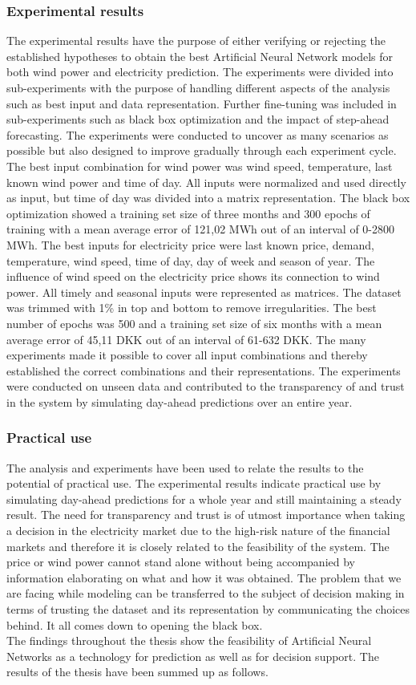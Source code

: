 \subsubsection{Experimental results}
The experimental results have the purpose of either verifying or rejecting the established hypotheses to obtain the best Artificial Neural Network models for both wind power and electricity prediction. The experiments were divided into sub-experiments with the purpose of handling different aspects of the analysis such as best input and data representation. Further fine-tuning was included in sub-experiments such as black box optimization and the impact of step-ahead forecasting. The experiments were conducted to uncover as many scenarios as possible but also designed to improve gradually through each experiment cycle. The best input combination for wind power was wind speed, temperature, last known wind power and time of day. All inputs were normalized and used directly as input, but time of day was divided into a matrix representation. The black box optimization showed a training set size of three months and 300 epochs of training with a mean average error of 121,02 MWh out of an interval of 0-2800 MWh. The best inputs for electricity price were last known price, demand, temperature, wind speed, time of day, day of week and season of year. The influence of wind speed on the electricity price shows its connection to wind power. All timely and seasonal inputs were represented as matrices. The dataset was trimmed with 1\% in top and bottom to remove irregularities. The best number of epochs was 500 and a training set size of six months with a mean average error of 45,11 DKK out of an interval of 61-632 DKK. The many experiments made it possible to cover all input combinations and thereby established the correct combinations and their representations. The experiments were conducted on unseen data and contributed to the transparency of and trust in the system by simulating day-ahead predictions over an entire year.
\subsubsection{Practical use}
The analysis and experiments have been used to relate the results to the potential of practical use. The experimental results indicate practical use by simulating day-ahead predictions for a whole year and still maintaining a steady result. The need for transparency and trust is of utmost importance when taking a decision in the electricity market due to the high-risk nature of the financial markets and therefore it is closely related to the feasibility of the system. The price or wind power cannot stand alone without being accompanied by information elaborating on what and how it was obtained. The problem that we are facing while modeling can be transferred to the subject of decision making in terms of trusting the dataset and its representation by communicating the choices behind. It all comes down to opening the black box.
\\[1cm]
The findings throughout the thesis show the feasibility of Artificial Neural Networks as a technology for prediction as well as for decision support. The results of the thesis have been summed up as follows.

